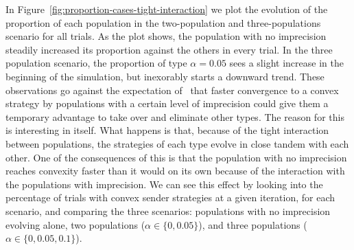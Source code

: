 \documentclass[a4paper]{article}
\begin{document}
In Figure~\ref{fig:proportion-cases-tight-interaction} we plot the evolution of the proportion of each population in the two-population and three-populations scenario for all trials.
As the plot shows, the population with no imprecision steadily increased its proportion against the others in every trial.
In the three population scenario, the proportion of type $\alpha = 0.05$ sees a slight increase in the beginning of the simulation, but inexorably starts a downward trend.
These observations go against the expectation of~\textcite{franke_vagueness_2017} that faster convergence to a convex strategy by populations with a certain level of imprecision could give them a temporary advantage to take over and eliminate other types.
The reason for this is interesting in itself.
What happens is that, because of the tight interaction between populations, the strategies of each type evolve in close tandem with each other.
One of the consequences of this is that the population with no imprecision reaches convexity faster than it would on its own because of the interaction with the populations with imprecision.
We can see this effect by looking into the percentage of trials with convex sender strategies at a given iteration, for each scenario, and comparing the three scenarios: populations with no imprecision evolving alone, two populations ($\alpha \in \{0, 0.05\}$), and three populations ($\alpha \in \{0, 0.05, 0.1\}$).
\end{document}
